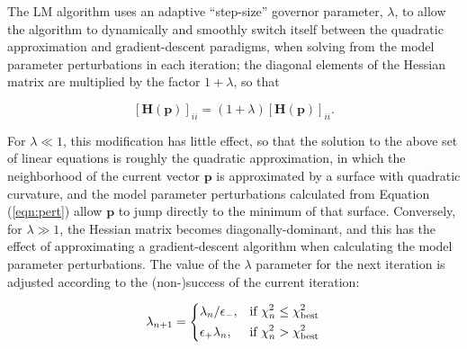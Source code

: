 \documentclass[11pt]{article}
\begin{document}
The LM algorithm uses an adaptive ``step-size'' governor parameter, $\lambda$, to allow the algorithm
to dynamically and smoothly switch itself between the quadratic approximation and gradient-descent paradigms,
when solving from the model parameter perturbations in each iteration; the diagonal elements of the Hessian
matrix are multiplied by the factor $1+\lambda$, so that

\begin{equation}
\left[\mathbf{H}(\mathbf{p})\right]_{ii} = \left(1 + \lambda\right)\left[\mathbf{H}(\mathbf{p})\right]_{ii}.
\end{equation}

For $\lambda \ll 1$, this modification has little effect, so that the solution to the above set of linear
equations is roughly the quadratic approximation, in which the neighborhood of the current vector $\mathbf{p}$
is approximated by a surface with quadratic curvature, and the model parameter perturbations calculated
from Equation (\ref{eqn:pert}) allow $\mathbf{p}$ to jump directly to the minimum of that surface. Conversely,
for $\lambda \gg 1$, the Hessian matrix becomes diagonally-dominant, and this has the effect of approximating
a gradient-descent algorithm when calculating the model parameter perturbations.  The value of the $\lambda$
parameter for the next iteration is adjusted according to the (non-)success of the current iteration:

\begin{equation}
\lambda_{n+1} = 
\begin{dcases}
\lambda_{n}/\epsilon_{-},& \text{if } \chi^{2}_{n} \leq \chi^{2}_{\mathrm{best}}\\
\epsilon_{+}\lambda_{n},& \text{if } \chi^{2}_{n} > \chi^{2}_{\mathrm{best}}
\end{dcases}
\end{equation}
\end{document}
